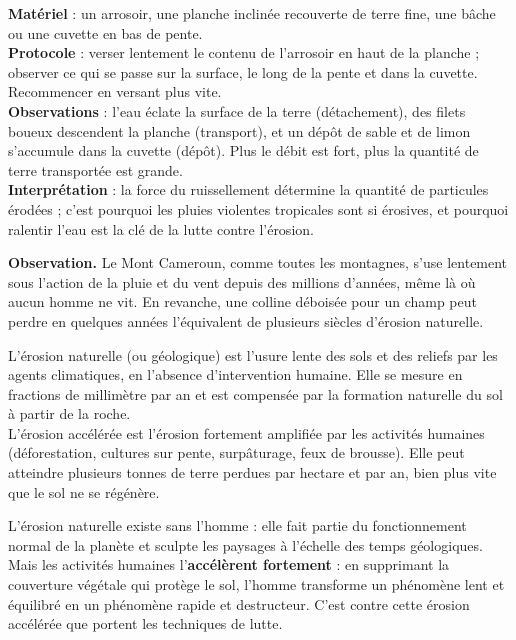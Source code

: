 \documentclass[11pt]{article}
\newcommand{\cle}[1]{{\popxbold\color{popdark}#1}}
\newcounter{popsec}
\newcounter{popsub}
\newcommand{\courssub}[1]{%
  \stepcounter{popsub}%
  \par\vspace{9pt}\noindent{\popxbold\fontsize{11.5}{13}\selectfont\color{popink}{\color{poporange}\thepopsec.\thepopsub}\hspace{6pt}#1}\par\nopagebreak\vspace{4pt}
}
\begin{document}
\begin{experience}
\textbf{Matériel} : un arrosoir, une planche inclinée recouverte de terre fine, une bâche ou une cuvette en bas de pente.\\
\textbf{Protocole} : verser lentement le contenu de l'arrosoir en haut de la planche ; observer ce qui se passe sur la surface, le long de la pente et dans la cuvette. Recommencer en versant plus vite.\\
\textbf{Observations} : l'eau éclate la surface de la terre (détachement), des filets boueux descendent la planche (transport), et un dépôt de sable et de limon s'accumule dans la cuvette (dépôt). Plus le débit est fort, plus la quantité de terre transportée est grande.\\
\textbf{Interprétation} : la force du ruissellement détermine la quantité de particules érodées ; c'est pourquoi les pluies violentes tropicales sont si érosives, et pourquoi ralentir l'eau est la clé de la lutte contre l'érosion.
\end{experience}

\courssub{Érosion naturelle et érosion accélérée}

\textbf{Observation.} Le Mont Cameroun, comme toutes les montagnes, s'use lentement sous l'action de la pluie et du vent depuis des millions d'années, même là où aucun homme ne vit. En revanche, une colline déboisée pour un champ peut perdre en quelques années l'équivalent de plusieurs siècles d'érosion naturelle.

\begin{definition}
L'\cle{érosion naturelle} (ou géologique) est l'usure lente des sols et des reliefs par les agents climatiques, en l'absence d'intervention humaine. Elle se mesure en fractions de millimètre par an et est compensée par la formation naturelle du sol à partir de la roche.\\
L'\cle{érosion accélérée} est l'érosion fortement amplifiée par les activités humaines (déforestation, cultures sur pente, surpâturage, feux de brousse). Elle peut atteindre plusieurs tonnes de terre perdues par hectare et par an, bien plus vite que le sol ne se régénère.
\end{definition}

\begin{aretenir}
L'érosion naturelle existe sans l'homme : elle fait partie du fonctionnement normal de la planète et sculpte les paysages à l'échelle des temps géologiques. Mais les activités humaines l'\textbf{accélèrent fortement} : en supprimant la couverture végétale qui protège le sol, l'homme transforme un phénomène lent et équilibré en un phénomène rapide et destructeur. C'est contre cette érosion accélérée que portent les techniques de lutte.
\end{aretenir}
\end{document}
